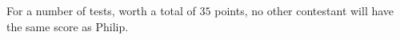 For a number of tests, worth a total of $35$ points, no other contestant will have the same score as Philip. 
